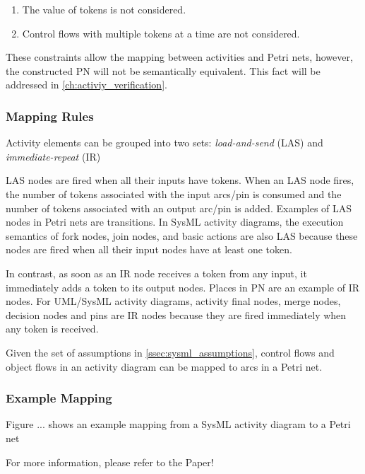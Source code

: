 \begin{enumerate}
	\item The value of tokens is not considered.
	\item Control flows with multiple tokens at a time are not considered.
\end{enumerate}

These constraints allow the mapping between activities and Petri nets, however, the constructed PN will not be semantically equivalent. This fact will be addressed in \autoref{ch:activiy_verification}.

\subsubsection{Mapping Rules}

Activity elements can be grouped into two sets: \emph{load-and-send} (LAS) and \emph{immediate-repeat} (IR)

LAS nodes are fired when all their inputs have tokens. When an LAS node fires, the number of tokens associated with the input arcs/pin is consumed and the number of tokens associated with an output arc/pin is added. Examples of LAS nodes in Petri nets are transitions. In SysML activity diagrams, the execution semantics of fork nodes, join nodes, and basic actions are also LAS because these nodes are fired when all their input nodes have at least one token.

In contrast, as soon as an IR node receives a token from any input, it immediately adds a token to its output nodes. Places in PN are an example of IR nodes. For UML/SysML activity diagrams, activity final nodes, merge nodes, decision nodes and pins are IR nodes because they are fired immediately when any token is received.

Given the set of assumptions in \autoref{ssec:sysml_assumptions}, control flows and object flows in an activity diagram can be mapped to arcs in a Petri net.

\subsubsection{Example Mapping}

Figure ... shows an example mapping from a SysML activity diagram to a Petri net

For more information, please refer to the Paper!